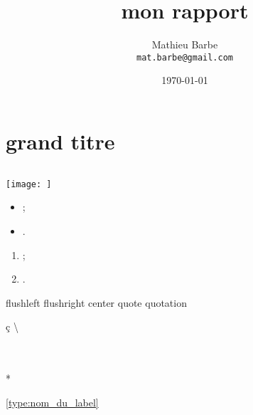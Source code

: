 


\title{mon rapport}
\author{Mathieu Barbe\\
\texttt{mat.barbe@gmail.com}}
\date{\today}

\maketitle
\section{}



\part[petit titre]{grand titre}
\section{}
\subsection{}
\subsubsection{}
\paragraph{}
\subparagraph{}

\texttt{[image: ]}

\begin{itemize}
\item ;
\item .
\end{itemize}

\begin{enumerate}
\item ;
\item .
\end{enumerate}

flushleft
flushright
center
quote
quotation

\emph{}
\textbf{}
\texttt{}
\textsl{}
\textsc{}

{\tiny }
{\scriptsize }
{\footnotesize }
{\small }
{\normalsize }
{\large }
{\Large }
{\LARGE }
{\huge }
{\Huge }

\c c
\textbar
\textbackslash

\\
\\*
\pagebreak 

\label{type:nom_du_label}
\label{chap:}
\label{sec:}
\label{subsec:}
\label{fig:}
\label{tab:}
\label{eq:}
\label{lst:}
\label{itm:}
\label{app:}

\ref{type:nom_du_label}
